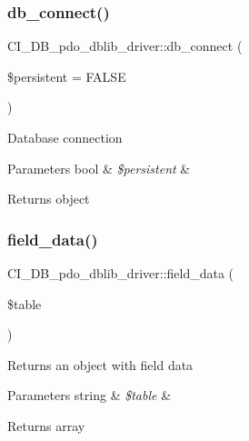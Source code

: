 \subsubsection{\texorpdfstring{db\+\_\+connect()}{db\_connect()}}
{\footnotesize\ttfamily C\+I\+\_\+\+D\+B\+\_\+pdo\+\_\+dblib\+\_\+driver\+::db\+\_\+connect (\begin{DoxyParamCaption}\item[{}]{\$persistent = {\ttfamily FALSE} }\end{DoxyParamCaption})}

Database connection


\begin{DoxyParams}[1]{Parameters}
bool & {\em \$persistent} & \\
\hline
\end{DoxyParams}
\begin{DoxyReturn}{Returns}
object 
\end{DoxyReturn}
\mbox{\label{class_c_i___d_b__pdo__dblib__driver_af463cbc58a25b8f2624fdb36d95b7f06}} 
\subsubsection{\texorpdfstring{field\+\_\+data()}{field\_data()}}
{\footnotesize\ttfamily C\+I\+\_\+\+D\+B\+\_\+pdo\+\_\+dblib\+\_\+driver\+::field\+\_\+data (\begin{DoxyParamCaption}\item[{}]{\$table }\end{DoxyParamCaption})}

Returns an object with field data


\begin{DoxyParams}[1]{Parameters}
string & {\em \$table} & \\
\hline
\end{DoxyParams}
\begin{DoxyReturn}{Returns}
array 
\end{DoxyReturn}
\mbox{\label{class_c_i___d_b__pdo__dblib__driver_ab79e90d8a40dca7daf10bdd726bd1ed7}} 
